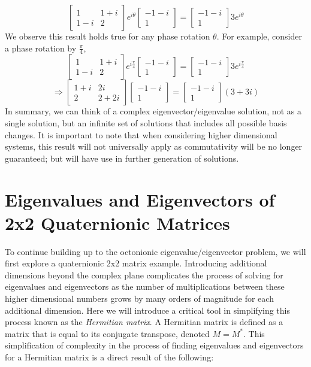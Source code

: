\documentclass{article}
\theoremstyle{plain}
\begin{document}
$$\begin{bmatrix}1 & 1+i\\1-i & 2\end{bmatrix}e^{i\theta}\begin{bmatrix}-1-i\\1\end{bmatrix}=\begin{bmatrix}-1-i\\1\end{bmatrix}3e^{i\theta}$$
We observe this result holds true for any phase rotation $\theta$. For example, consider a phase rotation by $\frac{\pi}{4}$,
$$\begin{bmatrix}1 & 1+i\\1-i & 2\end{bmatrix}e^{i\frac{\pi}{4}}\begin{bmatrix}-1-i\\1\end{bmatrix}=\begin{bmatrix}-1-i\\1\end{bmatrix}3e^{i\frac{\pi}{4}}$$
$$\Rightarrow\begin{bmatrix}1+i & 2i\\2 & 2+2i\end{bmatrix}\begin{bmatrix}-1-i\\1\end{bmatrix}=\begin{bmatrix}-1-i\\1\end{bmatrix}(3+3i)$$
In summary, we can think of a complex eigenvector/eigenvalue solution, not as a single solution, but an infinite set of solutions that includes all possible basis changes. It is important to note that when considering higher dimensional systems, this result will not universally apply as commutativity will be no longer guaranteed; but will have use in further generation of solutions.

\section{Eigenvalues and Eigenvectors of 2x2 Quaternionic Matrices}
To continue building up to the octonionic eigenvalue/eigenvector problem, we will first explore a quaternionic 2x2 matrix example. Introducing additional dimensions beyond the complex plane complicates the process of solving for eigenvalues and eigenvectors as the number of multiplications between these higher dimensional numbers grows by many orders of magnitude for each additional dimension. Here we will introduce a critical tool in simplifying this process known as the \emph{Hermitian matrix}. A Hermitian matrix is defined as a matrix that is equal to its conjugate transpose, denoted $M=M^{*}$. This simplification of complexity in the process of finding eigenvalues and eigenvectors for a Hermitian matrix is a direct result of the following:
\end{document}
